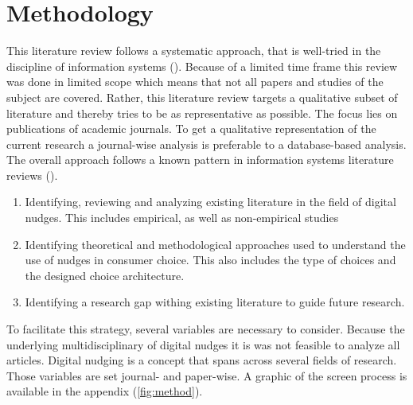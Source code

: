 \section{Methodology}

This literature review follows a systematic approach, that is well-tried in the discipline of information systems (\cite{webster_analyzing_2002}). Because of a limited time frame this review was done in limited scope which means that not all papers and studies of the subject are covered. Rather, this literature review targets a qualitative subset of literature and thereby tries to be as representative as possible. The focus lies on publications of academic journals. To get a qualitative representation of the current research a journal-wise analysis is preferable to a database-based analysis. The overall approach follows a known pattern in information systems literature reviews (\cite{alavi_review_1992}).
\begin{enumerate}
\item Identifying, reviewing and analyzing existing literature in the field of digital nudges. This includes empirical, as well as non-empirical studies
\item Identifying theoretical and methodological approaches used to understand the use of nudges in consumer choice. This also includes the type of choices and the designed choice architecture.
\item Identifying a research gap withing existing literature to guide future research.
\end{enumerate}

To facilitate this strategy, several variables are necessary to consider. Because the underlying multidisciplinary  of digital nudges it is was not feasible to analyze all articles. Digital nudging is a concept that spans across several fields of research. Those variables are set journal- and paper-wise. A graphic of the screen process is available in the appendix (\ref{fig:method}).

